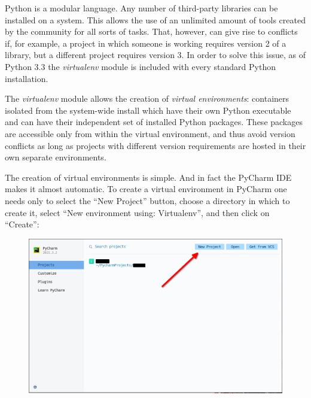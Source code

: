 \documentclass[a4paper,12pt]{article}
\begin{document}
Python is a modular language. Any number of third-party libraries can be installed on a system. This allows the use of an unlimited amount of tools created by the community for all sorts of tasks. That, however, can give rise to conflicts if, for example, a project in which someone is working requires version 2 of a library, but a different project requires version 3. In order to solve this issue, as of Python 3.3 the {\slshape virtualenv} module is included with every standard Python installation.

The {\slshape virtualenv} module allows the creation of {\itshape virtual environments}: containers isolated from the system-wide install which have their own Python executable and can have their independent set of installed Python packages. These packages are accessible only from within the virtual environment, and thus avoid version conflicts as long as projects with different version requirements are hosted in their own separate environments.

The creation of virtual environments is simple. And in fact the PyCharm IDE makes it almost automatic. To create a virtual environment in PyCharm one needs only to select the ``New Project'' button, choose a directory in which to create it, select ``New environment using: Virtualenv'', and then click on ``Create'':

\begin{figure}[!ht]
    \begin{center}
        \includegraphics[scale=0.5]{pycharm-new-project.png}
    \end{center}
\end{figure}
\end{document}
